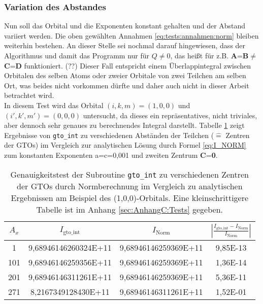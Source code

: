 \subsubsection{Variation des Abstandes} 
\label{sec:var.Abstand_norm}
%
Nun soll das Orbital und die Exponenten konstant gehalten und der 
Abstand variiert werden. Die oben gewählten Annahmen 
\ref{eq:tests:annahmen:norm} bleiben weiterhin 
bestehen. An dieser Stelle sei nochmal darauf hingewiesen, dass der Algorithmus 
und damit das Programm nur für $Q\neq0$, das heißt für z.B.  
\textbf{A}=\textbf{B}$\neq$\textbf{C}=\textbf{D} funktioniert. 
(??) Dieser Fall entspricht einem Überlappintegral zwischen Orbitalen des 
selben 
Atoms oder zweier Orbitale von zwei Teilchen am selben Ort, was beides nicht 
vorkommen dürfte und daher auch nicht in dieser Arbeit betrachtet wird. \\
In diesem Test wird das Orbital $(i,k,m)=(1,0,0)$ und 
$(i',k',m')=(0,0,0)$ untersucht, da dieses ein 
repräsentatives, nicht triviales, aber dennoch sehr 
genaues zu berechnendes  Integral 
darstellt. Tabelle \ref{tab:norm:abstände} zeigt Ergebnisse von 
\texttt{gto\_int} zu 
verschiedenen Abständen der Teilchen ($\hat{=}$ Zentren der GTOs) im 
Vergleich zur analytischen Lösung durch Formel \ref{eq:I_NORM} zum konstanten 
Exponenten a=c=0,001 und zweiten Zentrum \textbf{C}=\textbf{0}.
%
\begin{table}[H] \centering
	\caption{Genauigkeitstest der Subroutine \texttt{gto\_int} 
	zu verschiedenen 
		Zentren der GTOs durch Normberechnung im Vergleich zu analytischen 
		Ergebnissen am Beispiel des (1,0,0)-Orbitals. 
		Eine kleinschrittigere Tabelle ist im Anhang 
		\ref{sec:AnhangC:Tests} gegeben.} \vspace{0.2cm}
	\begin{threeparttable} 
		\begin{tabular}{c||c||c||c}
			$A_x$&  $I_\text{gto\_int}$            &  $I_\text{Norm}$     
			&$\left|\frac{I_\text{gto\_int}-I_\text{Norm}}{I_\text{Norm}}\right|$
			\\ \hline\hline
			1   & 9,68946146260324E+11 & 9,68946146259369E+11 & 9,85E-13 \\
			101 & 9,68946146259356E+11 & 9,68946146259369E+11 & 1,36E-14 \\
			201 & 9,68946146311261E+11 & 9,68946146259369E+11 & 5,36E-11 \\
			271 & 8,2167349128430E+11 & 
			9,68946146311261E+11 & 1,52E-01\\
		\end{tabular}
	\end{threeparttable}
	\label{tab:norm:abstände}
\end{table}

